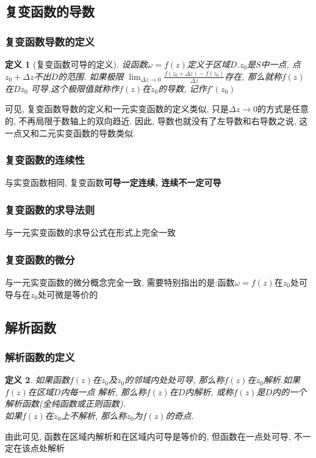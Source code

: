\documentclass[12pt, a4paper, oneside]{ctexart}
\newtheorem{definition}{定义}[section]
\begin{document}
\subsection{复变函数的导数}

\subsubsection{复变函数导数的定义}
\begin{definition}[复变函数可导的定义]
    设函数$\omega=f(z)$定义于区域$D$.$z_{0}$是$S$中一点, 点$z_{0}+\Delta z$不出$D$的范围. 如果极限
    $\lim_{\Delta z\to0}\frac{f(z_{0}+\Delta z)-f(z_{0})}{\Delta z}$存在, 那么就称$f(z)$在$Dz_{0}$
    可导.这个极限值就称作$f(z)$在$z_{0}$的导数, 记作$f'(z_{0})$
\end{definition}

可见, 复变函数导数的定义和一元实变函数的定义类似, 只是$\Delta z\to 0$的方式是任意的, 不再局限于数轴上的双向趋近. 
因此, 导数也就没有了左导数和右导数之说, 这一点又和二元实变函数的导数类似.

\subsubsection{复变函数的连续性}
与实变函数相同, 复变函数\textbf{可导一定连续, 连续不一定可导}

\subsubsection{复变函数的求导法则}
与一元实变函数的求导公式在形式上完全一致

\subsubsection{复变函数的微分}
与一元实变函数的微分概念完全一致, 需要特别指出的是:函数$\omega=f(z)$在$z_{0}$处可导与在$z_{0}$处可微是等价的

\subsection{解析函数}
\subsubsection{解析函数的定义}
\begin{definition}
    如果函数$f(z)$在$z_{0}$及$z_{0}$的邻域内处处可导, 那么称$f(z)$在$z_{0}$解析.如果$f(z)$在区域$D$内每一点
    解析, 那么称$f(z)$在$D$内解析, 或称$f(z)$是$D$内的一个解析函数(全纯函数或正则函数).\\
    如果$f(z)$在$z_{0}$上不解析, 那么称$z_{0}$为$f(z)$的奇点.
\end{definition}
由此可见, 函数在区域内解析和在区域内可导是等价的, 但函数在一点处可导, 不一定在该点处解析
\end{document}
